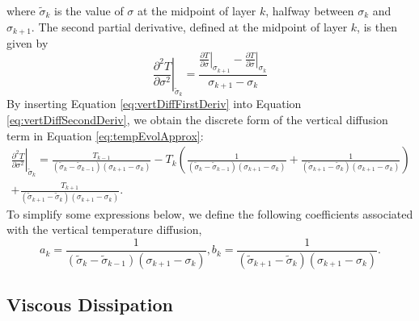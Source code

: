 \noindent
where $\tilde{\sigma}_k$ is the value of $\sigma$ at the midpoint of layer $k$, halfway between $\sigma_{k}$ and $\sigma_{k+1}$.
The second partial derivative, defined at the midpoint of layer $k$, is then given by
\begin{equation}
  \label{eq:vertDiffSecondDeriv}
        {{\left. \frac{{{\partial }^{2}}T}{\partial {{\sigma }^{2}}} \right|}_{{{{\tilde{\sigma }}}_{k}}}} =
        \frac{{{\left. \frac{\partial T}{\partial \sigma } \right|}_{{{\sigma }_{k+1}}}} - {{\left. \frac{\partial T}{\partial \sigma } \right|}_{{{\sigma }_{k}}}}} 
             {{{\sigma }_{k+1}}-{{\sigma }_{k}}}
\end{equation}
%
By inserting Equation \eqref{eq:vertDiffFirstDeriv} into Equation \eqref{eq:vertDiffSecondDeriv}, we obtain the discrete form of the vertical diffusion term in Equation \ref{eq:tempEvolApprox}:
\begin{multline}
    \label{eq:vertDiffterm}
          {{\left. \frac{{{\partial }^{2}}T}{\partial {{\sigma }^{2}}} \right|}_{{{{\tilde{\sigma }}}_{k}}}} =
          \frac{{{T}_{k-1}}}{\left( {{{\tilde{\sigma }}}_{k}}-{{{\tilde{\sigma }}}_{k-1}} \right)\left( {{\sigma }_{k+1}}-{{\sigma }_{k}} \right)}
          - {{T}_{k}}\left( \frac{1}{\left( {{{\tilde{\sigma }}}_{k}}-{{{\tilde{\sigma }}}_{k-1}} \right)\left( {{\sigma }_{k+1}}-{{\sigma }_{k}} \right)}+\frac{1}{\left( {{{\tilde{\sigma }}}_{k+1}}-{{{\tilde{\sigma }}}_{k}} \right)\left( {{\sigma }_{k+1}}-{{\sigma }_{k}} \right)} \right)\\
          +\frac{{{T}_{k+1}}}{\left( {{{\tilde{\sigma }}}_{k+1}}-{{{\tilde{\sigma }}}_{k}} \right)\left( {{\sigma }_{k+1}}-{{\sigma }_{k}} \right)}.
\end{multline}
%
To simplify some expressions below, we define the following coefficients associated with the vertical temperature diffusion, 
\begin{equation}
\label{eq:coeff}
a_k = \frac{1}{\left( {{{\tilde{\sigma }}}_{k}} -{{{\tilde{\sigma }}}_{k-1}} \right)\left( {{\sigma }_{k+1}}-{{\sigma }_{k}} \right)},   b_k = \frac{1}{\left( {{{\tilde{\sigma }}}_{k+1}}-{{{\tilde{\sigma }}}_{k}} \right)\left( {{\sigma }_{k+1}}-{{\sigma }_{k}} \right)}.
\end{equation}

\subsection{Viscous Dissipation}
\label{sec:TviscDissp}

